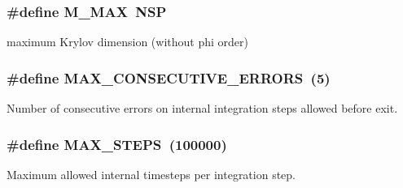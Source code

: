 \subsubsection[{\texorpdfstring{M\+\_\+\+M\+AX}{M_MAX}}]{\setlength{\rightskip}{0pt plus 5cm}\#define M\+\_\+\+M\+AX~N\+SP}\hypertarget{exprb43__props_8cuh_a61819141b0164a35f4d791b0e696721f}{}\label{exprb43__props_8cuh_a61819141b0164a35f4d791b0e696721f}


maximum Krylov dimension (without phi order) 

\subsubsection[{\texorpdfstring{M\+A\+X\+\_\+\+C\+O\+N\+S\+E\+C\+U\+T\+I\+V\+E\+\_\+\+E\+R\+R\+O\+RS}{MAX_CONSECUTIVE_ERRORS}}]{\setlength{\rightskip}{0pt plus 5cm}\#define M\+A\+X\+\_\+\+C\+O\+N\+S\+E\+C\+U\+T\+I\+V\+E\+\_\+\+E\+R\+R\+O\+RS~(5)}\hypertarget{exprb43__props_8cuh_a0f51553c710580b9899756f7ad472c93}{}\label{exprb43__props_8cuh_a0f51553c710580b9899756f7ad472c93}


Number of consecutive errors on internal integration steps allowed before exit. 

\subsubsection[{\texorpdfstring{M\+A\+X\+\_\+\+S\+T\+E\+PS}{MAX_STEPS}}]{\setlength{\rightskip}{0pt plus 5cm}\#define M\+A\+X\+\_\+\+S\+T\+E\+PS~(100000)}\hypertarget{exprb43__props_8cuh_aa0414caef00a64a51d4c6c0711d9e70a}{}\label{exprb43__props_8cuh_aa0414caef00a64a51d4c6c0711d9e70a}


Maximum allowed internal timesteps per integration step. 

